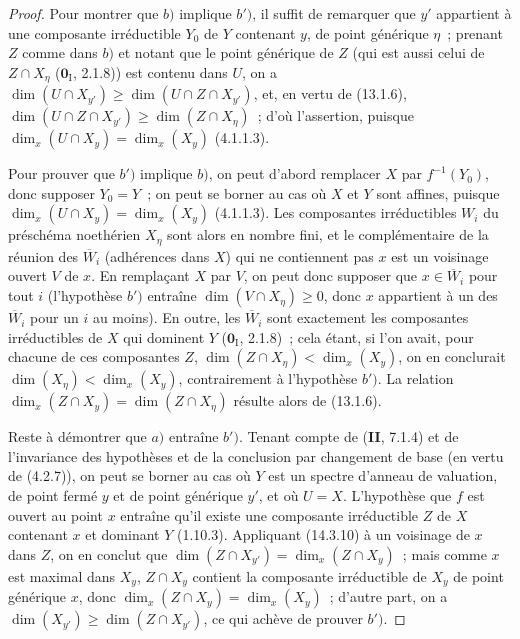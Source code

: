 \begin{proof}
Pour montrer que $b)$ implique $b')$, il suffit de remarquer que $y'$ appartient à
une composante irréductible $Y_0$ de $Y$ contenant $y$, de point générique $\eta$~;
prenant $Z$ comme dans $b)$ et notant que le point générique de $Z$ (qui est aussi
celui de $Z\cap X_\eta$ ($\mathbf{0}_{\mathrm I}$, 2.1.8)) est contenu dans $U$, on
a $\dim(U\cap X_{y'})\geq\dim(U\cap Z\cap X_{y'})$, et, en vertu de (13.1.6),
$\dim(U\cap Z\cap X_{y'})\geq\dim(Z\cap X_\eta)$~; d'où l'assertion, puisque
$\dim_x(U\cap X_y)=\dim_x(X_y)$ (4.1.1.3).

Pour prouver que $b')$ implique $b)$, on peut d'abord remplacer $X$ par
$f^{-1}(Y_0)$, donc supposer $Y_0=Y$~; on peut se borner au cas où $X$ et $Y$ sont
affines, puisque $\dim_x(U\cap X_y)=\dim_x(X_y)$ (4.1.1.3). Les composantes
irréductibles $W_i$ du préschéma noethérien $X_\eta$ sont alors en nombre fini, et
le complémentaire de la réunion des $\overline W_i$ (adhérences dans $X$) qui ne
contiennent pas $x$ est un voisinage ouvert $V$ de $x$. En remplaçant $X$ par $V$,
on peut donc supposer que $x\in\overline W_i$ pour tout $i$ (l'hypothèse $b')$
entraîne $\dim(V\cap X_\eta)\geq 0$, donc $x$ appartient à un des $\overline W_i$
pour un $i$ au moins). En outre, les $\overline W_i$ sont exactement les
composantes irréductibles de $X$ qui dominent $Y$ ($\mathbf{0}_{\mathrm I}$,
2.1.8)~; cela étant, si l'on avait, pour chacune de ces composantes $Z$,
$\dim(Z\cap X_\eta)<\dim_x(X_y)$, on en conclurait
$\dim(X_\eta)<\dim_x(X_y)$, contrairement à l'hypothèse $b')$. La relation
$\dim_x(Z\cap X_y)=\dim(Z\cap X_\eta)$ résulte alors de (13.1.6).

Reste à démontrer que $a)$ entraîne $b')$. Tenant compte de (\textbf{II}, 7.1.4)
et de l'invariance des hypothèses et de la conclusion par changement de base (en
vertu de (4.2.7)), on peut se borner au cas où $Y$ est un spectre d'anneau de
valuation, de point fermé $y$ et de point générique $y'$, et où $U=X$.
L'hypothèse que $f$ est ouvert au point $x$ entraîne qu'il existe une composante
irréductible $Z$ de $X$ contenant $x$ et dominant $Y$ (1.10.3). Appliquant
(14.3.10) à un voisinage de $x$ dans $Z$, on en conclut que
$\dim(Z\cap X_{y'})=\dim_x(Z\cap X_y)$~; mais comme $x$ est maximal dans $X_y$,
$Z\cap X_y$ contient la composante irréductible de $X_y$ de point générique $x$,
donc $\dim_x(Z\cap X_y)=\dim_x(X_y)$~; d'autre part, on a
$\dim(X_{y'})\geq\dim(Z\cap X_{y'})$, ce qui achève de prouver $b')$.
\end{proof}

